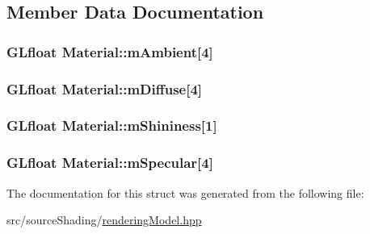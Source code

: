 \subsection{Member Data Documentation}
\hypertarget{struct_material_a9df39adc76f8131ff7c071339bd09eac}{
\subsubsection[{m\+Ambient}]{\setlength{\rightskip}{0pt plus 5cm}G\+Lfloat Material\+::m\+Ambient\mbox{[}4\mbox{]}}}\label{struct_material_a9df39adc76f8131ff7c071339bd09eac}
\hypertarget{struct_material_acedb2e5253e0891df7870845793f5ca2}{
\subsubsection[{m\+Diffuse}]{\setlength{\rightskip}{0pt plus 5cm}G\+Lfloat Material\+::m\+Diffuse\mbox{[}4\mbox{]}}}\label{struct_material_acedb2e5253e0891df7870845793f5ca2}
\hypertarget{struct_material_a6b74b1568a229d6f3306ce9c127ae256}{
\subsubsection[{m\+Shininess}]{\setlength{\rightskip}{0pt plus 5cm}G\+Lfloat Material\+::m\+Shininess\mbox{[}1\mbox{]}}}\label{struct_material_a6b74b1568a229d6f3306ce9c127ae256}
\hypertarget{struct_material_a1cab5986665fe4aaa3c9657ad513f596}{
\subsubsection[{m\+Specular}]{\setlength{\rightskip}{0pt plus 5cm}G\+Lfloat Material\+::m\+Specular\mbox{[}4\mbox{]}}}\label{struct_material_a1cab5986665fe4aaa3c9657ad513f596}


The documentation for this struct was generated from the following file\+:\begin{DoxyCompactItemize}
\item 
src/source\+Shading/\hyperlink{rendering_model_8hpp}{rendering\+Model.\+hpp}\end{DoxyCompactItemize}
